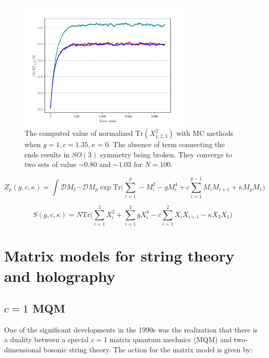 \documentclass[11pt]{article}
\begin{document}
\begin{figure}[htbp] 
	\centering 
	\includegraphics[width=0.75\textwidth]{figs/open_3MMC.pdf}
	\caption{\label{fig:F_app1}The computed value of normalized $\mbox{Tr}(X_{1,2,3}^2)$ with MC methods when $g=1, c=1.35, \kappa=0$. The absence of term connecting the ends results in  $SO(3)$ symmetry being broken. They converge to two sets of value $\sim 0.80$ and $\sim 1.03$ for $N = 100$.}
\end{figure}


\begin{equation}
	\label{eq:Mehta1} 
	Z_{p}(g,c,\kappa) = \int \mathcal{D}M_{1} \cdots  \mathcal{D}M_{p} \exp \mbox{Tr} \Bigg(\sum_{i=1}^{p} -M_{i}^2  - g M_{i}^{4} + c \sum_{i=1}^{p-1} M_{i}M_{i+1} 
	+ \kappa M_{p}M_{1} \Bigg)
\end{equation}

\begin{equation}
	\label{eq:Mehta2} 
	S(g,c,\kappa) = N \mbox{Tr} \Bigg(\sum_{i=1}^{3} X_{i}^2  + \sum_{i=1}^{3} g X_{i}^{4} - c \sum_{i=1}^{2} X_{i}X_{i+1} 
	- \kappa X_{3}X_{1} \Bigg)
\end{equation}

\section{Matrix models for string theory and holography} 

\subsection{$c=1$ MQM}
One of the significant developments in the 1990s was the realization that there is a duality between a special $c=1$ matrix quantum mechnics (MQM) and two-dimensional bosonic string theory. The action for the matrix model is given by:
\end{document}
